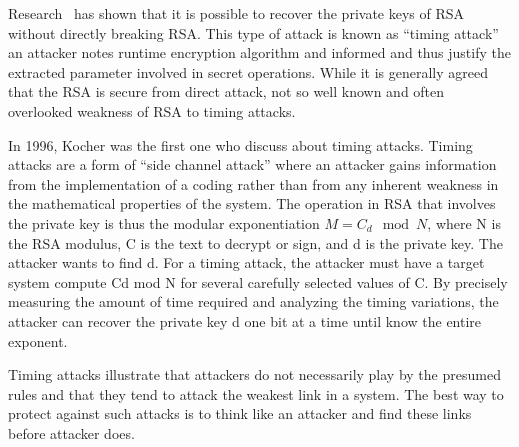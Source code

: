 \documentclass[12pt,journal,compsoc]{IEEEtran}
\begin{document}
Research~\cite{wong2005timing} has shown that it is possible to
recover the private keys of RSA without directly breaking RSA. This
type of attack is known as ``timing attack'' an attacker notes runtime
encryption algorithm and informed and thus justify the extracted
parameter involved in secret operations. While it is generally agreed
that the RSA is secure from direct attack, not so well known and often
overlooked weakness of RSA to timing attacks. 
\par
In 1996, Kocher was the first one who discuss about timing
attacks. Timing attacks are a form of ``side channel attack'' where an
attacker gains information from the implementation of a coding rather
than from any inherent weakness in the mathematical properties of the
system. The operation in RSA that involves the private key is thus the
modular exponentiation $M = C_{d} \mod N$, where N is the RSA modulus, C is
the text to decrypt or sign, and d is the private key. The attacker
wants to find d. For a timing attack, the attacker must have a target
system compute Cd mod N for several carefully selected values of C. By
precisely measuring the amount of time required and analyzing the
timing variations, the attacker can recover the private key d one bit
at a time until know the entire exponent. 
\par
Timing attacks illustrate that attackers do not necessarily play by
the presumed rules and that they tend to attack the weakest link in a
system. The best way to protect against such attacks is to think like
an attacker and find these links before attacker does. 

    
\end{document}
